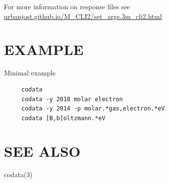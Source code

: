 For more information on response files see
\href{https://urbanjost.github.io/M\_CLI2/set\_args.3m\_cli2.html}{urbanjost.github.io/M\_CLI2/set\_args.3m\_cli2.html} 

\section*{EXAMPLE}
Minimal example

\begin{verbatim}
     codata
     codata -y 2018 molar electron
     codata -y 2014 -p molar.*gas,electron.*eV
     codata [B,b]oltzmann.*eV

\end{verbatim}
\section*{SEE ALSO}
codata(3)
